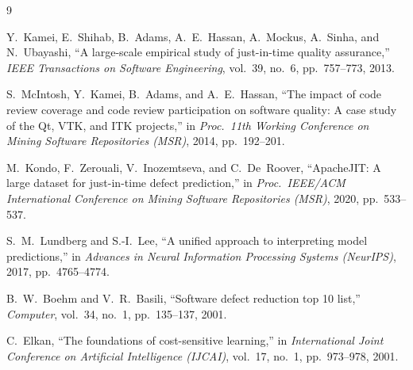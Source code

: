 \documentclass[12pt, a4paper]{article}
\begin{document}
\clearpage
\begin{thebibliography}{9}

Y.~Kamei, E.~Shihab, B.~Adams, A.~E.~Hassan, A.~Mockus, A.~Sinha, and N.~Ubayashi,
``A large-scale empirical study of just-in-time quality assurance,''
\textit{IEEE Transactions on Software Engineering}, vol.~39, no.~6, pp.~757--773, 2013.

S.~McIntosh, Y.~Kamei, B.~Adams, and A.~E.~Hassan,
``The impact of code review coverage and code review participation on software quality: A case study of the Qt, VTK, and ITK projects,''
in \textit{Proc.\ 11th Working Conference on Mining Software Repositories (MSR)}, 2014, pp.~192--201.

M.~Kondo, F.~Zerouali, V.~Inozemtseva, and C.~De~Roover,
``ApacheJIT: A large dataset for just-in-time defect prediction,''
in \textit{Proc.\ IEEE/ACM International Conference on Mining Software Repositories (MSR)}, 2020, pp.~533--537.

S.~M.~Lundberg and S.-I.~Lee,
``A unified approach to interpreting model predictions,''
in \textit{Advances in Neural Information Processing Systems (NeurIPS)}, 2017, pp.~4765--4774.

B.~W.~Boehm and V.~R.~Basili,
``Software defect reduction top 10 list,''
\textit{Computer}, vol.~34, no.~1, pp.~135--137, 2001.

C.~Elkan,
``The foundations of cost-sensitive learning,''
in \textit{International Joint Conference on Artificial Intelligence (IJCAI)}, vol.~17, no.~1, pp.~973--978, 2001.

\end{thebibliography}
\end{document}
